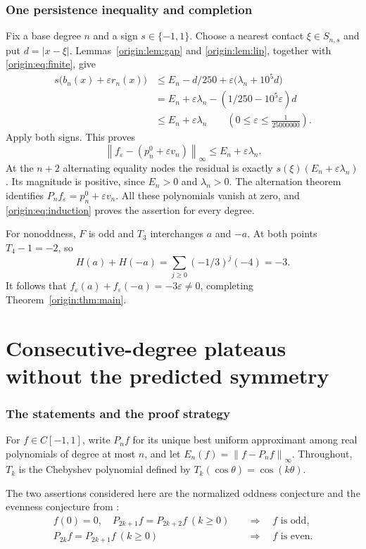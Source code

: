\documentclass[11pt]{article}
\theoremstyle{remark}\newtheorem{remark}[theorem]{Remark}
\newcommand{\norm}[1]{\left\lVert #1\right\rVert_\infty}
\begin{document}
\section{One persistence inequality and completion}
Fix a base degree $n$ and a sign $s\in\{-1,1\}$. Choose a nearest contact
$\xi\in S_{n,s}$ and put $d=|x-\xi|$. Lemmas~\ref{origin:lem:gap} and
\ref{origin:lem:lip}, together with \eqref{origin:eq:finite}, give
\begin{align*}
 s\bigl(b_n(x)+\varepsilon r_n(x)\bigr)
 &\le E_n-d/250+\varepsilon\bigl(\lambda_n+10^5d\bigr)\\
 &=E_n+\varepsilon\lambda_n-(1/250-10^5\varepsilon)d\\
 &\le E_n+\varepsilon\lambda_n
 \qquad\left(0\le\varepsilon\le\frac1{25000000}\right).
\end{align*}
Apply both signs. This proves
\[
 \norm{f_\varepsilon-(p_n^0+\varepsilon v_n)}\le E_n+\varepsilon\lambda_n.
\]
At the $n+2$ alternating equality nodes the residual is exactly
$s(\xi)(E_n+\varepsilon\lambda_n)$. Its magnitude is positive, since
$E_n>0$ and $\lambda_n>0$. The alternation theorem identifies
$P_n f_\varepsilon=p_n^0+\varepsilon v_n$. All these polynomials vanish at
zero, and \eqref{origin:eq:induction} proves the assertion for every degree.

For nonoddness, $F$ is odd and $T_3$ interchanges $a$ and $-a$.
At both points $T_4-1=-2$, so
\[
 H(a)+H(-a)=\sum_{j\ge0}(-1/3)^j(-4)=-3.
\]
It follows that $f_\varepsilon(a)+f_\varepsilon(-a)=-3\varepsilon\ne0$,
completing Theorem~\ref{origin:thm:main}.


\part{Consecutive-degree plateaus without the predicted symmetry}
\section{The statements and the proof strategy}

For $f\in C[-1,1]$, write $P_n f$ for its unique best uniform approximant
among real polynomials of degree at most $n$, and let
$E_n(f)=\norm{f-P_n f}$. Throughout, $T_k$ is the Chebyshev polynomial
defined by $T_k(\cos\theta)=\cos(k\theta)$.

The two assertions considered here are the normalized oddness conjecture
and the evenness conjecture from \cite{SaffVarga}:
\begin{align*}
 f(0)=0,\quad P_{2k+1}f=P_{2k+2}f\ (k\ge0)
 &\quad\Longrightarrow\quad f\text{ is odd},\\
 P_{2k}f=P_{2k+1}f\ (k\ge0)
 &\quad\Longrightarrow\quad f\text{ is even}.
\end{align*}
\end{document}
